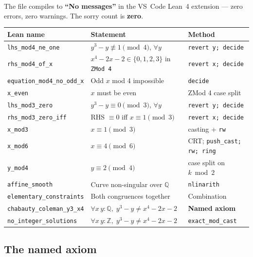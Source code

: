 \documentclass[12pt, a4paper]{article}
\theoremstyle{definition}
\newcommand{\Z}{\mathbb{Z}}
\newcommand{\Q}{\mathbb{Q}}
\begin{document}
The file compiles to \textbf{``No messages''} in the VS~Code Lean~4 extension
--- zero errors, zero warnings.  The sorry count is \textbf{zero}.

\begin{center}
\renewcommand{\arraystretch}{1.3}
\begin{tabular}{lll}
\toprule
\textbf{Lean name} & \textbf{Statement} & \textbf{Method} \\
\midrule
\texttt{lhs\_mod4\_ne\_one}       & $y^3-y \not\equiv 1\pmod{4}$, $\forall y$   & \texttt{revert y; decide} \\
\texttt{rhs\_mod4\_of\_x}         & $x^4-2x-2 \in \{0,1,2,3\}$ in \texttt{ZMod 4} & \texttt{revert x; decide} \\
\texttt{equation\_mod4\_no\_odd\_x} & Odd $x$ mod 4 impossible  & \texttt{decide} \\
\texttt{x\_even}                  & $x$ must be even            & ZMod 4 case split \\
\texttt{lhs\_mod3\_zero}          & $y^3-y\equiv 0\pmod{3}$, $\forall y$  & \texttt{revert y; decide} \\
\texttt{rhs\_mod3\_zero\_iff}     & RHS $\equiv 0$ iff $x\equiv 1\pmod 3$ & \texttt{revert x; decide} \\
\texttt{x\_mod3}                  & $x \equiv 1 \pmod{3}$       & casting + \texttt{rw} \\
\texttt{x\_mod6}                  & $x \equiv 4 \pmod{6}$       & CRT; \texttt{push\_cast; rw; ring} \\
\texttt{y\_mod4}                  & $y \equiv 2 \pmod{4}$       & case split on $k \bmod 2$ \\
\texttt{affine\_smooth}           & Curve non-singular over $\Q$ & \texttt{nlinarith} \\
\texttt{elementary\_constraints}  & Both congruences together   & Combination \\
\midrule
\texttt{chabauty\_coleman\_y3\_x4} & $\forall x\,y:\Q,\; y^3-y \neq x^4-2x-2$ & \textbf{Named axiom} \\
\midrule
\texttt{no\_integer\_solutions}   & $\forall x\,y:\Z,\; y^3-y \neq x^4-2x-2$ & \texttt{exact\_mod\_cast} \\
\bottomrule
\end{tabular}
\end{center}

\subsection{The named axiom}
\end{document}
